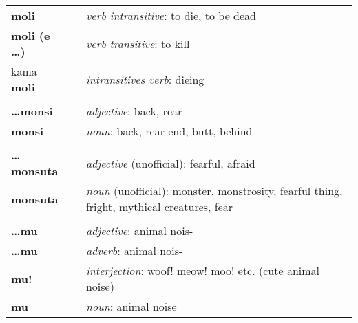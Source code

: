 \begin{supertabular}{p{2,5cm}|ll}
    \textbf{moli}                &  & \textit{verb intransitive}: to die, to be dead                                                             \\
    \textbf{moli (e \dots)}      &  & \textit{verb transitive}: to kill                                                                          \\
    kama \textbf{moli}           &  & \textit{intransitives verb}: dieing                                                                        \\
                                 &  &                                                                                                            \\ %
    \textbf{\dots monsi}         &  & \textit{adjective}: back, rear                                                                             \\
    \textbf{monsi}               &  & \textit{noun}: back, rear end, butt, behind                                                                \\
                                 &  &                                                                                                            \\ %
    \textbf{\dots monsuta}       &  & \textit{adjective} (unofficial): fearful, afraid                                                           \\
    \textbf{monsuta}             &  & \textit{noun} (unofficial): monster, monstrosity, fearful thing, fright, mythical creatures, fear          \\
                                 &  &                                                                                                            \\ %
    \textbf{\dots mu}            &  & \textit{adjective}: animal nois-                                                                           \\
    \textbf{\dots mu}            &  & \textit{adverb}: animal nois-                                                                              \\
    \textbf{mu!}                 &  & \textit{interjection}: woof! meow! moo! etc. (cute animal noise)                                           \\
    \textbf{mu}                  &  & \textit{noun}: animal noise                                                                                \\

\end{supertabular}
